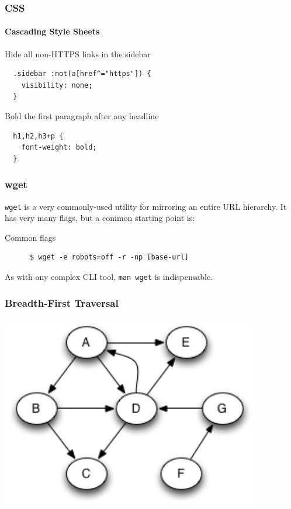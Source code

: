 \documentclass[dvipsnames]{beamer}
\begin{document}
\begin{frame}[fragile=singleslide]
  \frametitle{CSS}
  \framesubtitle{Cascading Style Sheets}
 
  \begin{block}{Hide all non-HTTPS links in the sidebar}
    \begin{Verbatim}
  .sidebar :not(a[href^="https"]) {
    visibility: none;
  }
    \end{Verbatim}
  \end{block} 

  \begin{block}{Bold the first paragraph after any headline}
    \begin{Verbatim}
  h1,h2,h3+p {
    font-weight: bold;
  }
    \end{Verbatim}
  \end{block}
\end{frame}


\begin{frame}[fragile=singleslide]
  \frametitle{wget}

  \texttt{wget} is a very commonly-used utility for mirroring an entire URL hierarchy.
  It has very many flags, but a common starting point is:

  \bigskip

  \begin{block}{Common flags}
    \begin{Verbatim}
      $ wget -e robots=off -r -np [base-url]
    \end{Verbatim}
  \end{block}

  \bigskip

  As with any complex CLI tool, \texttt{man wget} is indispensable.
\end{frame}


\begin{frame}
  \frametitle{Breadth-First Traversal}
  \includegraphics[width=320pt]{img/directed-cyclic-graph.png}
\end{frame}
\end{document}

